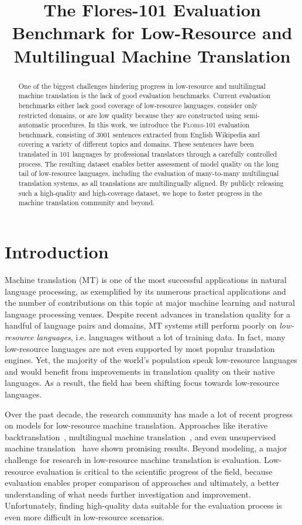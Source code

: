\title{The Flores-101 Evaluation Benchmark for Low-Resource and Multilingual Machine Translation}

\begin{abstract}
One of the biggest challenges hindering progress in low-resource and multilingual machine translation is the lack of good evaluation benchmarks. Current evaluation benchmarks either lack good coverage of low-resource languages, consider only restricted domains, or are low quality because they are constructed using semi-automatic procedures. In this work, we introduce the \textsc{Flores-101} evaluation benchmark, consisting of 3001 sentences extracted from English Wikipedia and covering a variety of different topics and domains. These sentences have been translated in 101 languages by professional translators through a carefully controlled process. The resulting dataset enables better assessment of model quality on the long tail of low-resource languages, including the evaluation of many-to-many multilingual translation systems, as all translations are multilingually aligned. By publicly releasing such a high-quality and high-coverage dataset, we hope to foster progress in the machine translation community and beyond.
\end{abstract}

\section{Introduction} 
\label{intro}

Machine translation (MT) is one of the most successful applications in natural language processing, as exemplified by its numerous practical applications and the number of contributions on this topic at major machine learning and natural language processing venues. Despite recent advances in translation quality for a handful of language pairs and domains, MT systems still perform poorly on \textit{low-resource languages}, i.e. languages without a lot of training data. In fact, many low-resource languages are not even supported by most popular translation engines.  Yet, the majority of the world's population speak low-resource languages and would benefit from improvements in translation quality on their native languages. As a result, the field has been shifting focus towards low-resource languages.

Over the past decade, the research community has made a lot of recent progress on models for low-resource machine translation. Approaches like iterative backtranslation~\citep{sennrich2015improving}, multilingual machine translation~\cite{gmt17,tang2020ml50, fan2020beyond}, and even unsupervised machine translation~\citep{lample_emnlp2018,artetxe_emnlp2018} have shown promising results. Beyond modeling, a major challenge for research in low-resource machine translation is evaluation. Low-resource evaluation is critical to the scientific progress of the field, because evaluation enables proper comparison of approaches and ultimately, a better understanding of what needs further investigation and improvement. Unfortunately, finding high-quality data suitable for the evaluation process is even more difficult in low-resource scenarios.

